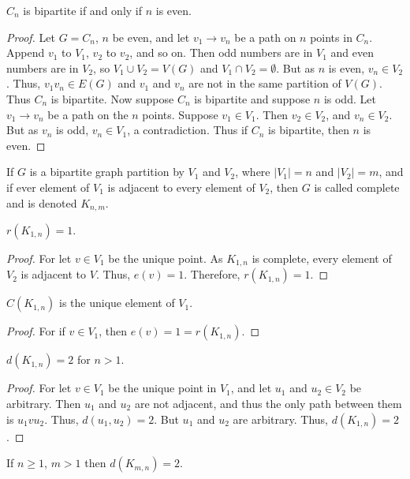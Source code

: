 \documentclass[crop=false,class=book,oneside]{standalone}
\begin{document}
\begin{theorem}
$C_n$ is bipartite if and only if $n$ is even. 
\end{theorem}
\begin{proof}
Let $G=C_n$, $n$ be even, and let $v_1\rightarrow v_n$ be a path on $n$ points in $C_n$. Append $v_1$ to $V_1$, $v_2$ to $v_2$, and so on. Then odd numbers are in $V_1$ and even numbers are in $V_2$, so $V_1\cup V_2 = V(G)$ and $V_1 \cap V_2 = \emptyset$. But as $n$ is even, $v_n \in V_2$. Thus, $v_1 v_n \in E(G)$ and $v_1$ and $v_n$ are not in the same partition of $V(G)$. Thus $C_n$ is bipartite. Now suppose $C_n$ is bipartite and suppose $n$ is odd. Let $v_1 \rightarrow v_n$ be a path on the $n$ points. Suppose $v_1 \in V_1$. Then $v_2 \in V_2$, and $v_n \in V_2$. But as $v_n$ is odd, $v_{n} \in V_1$, a contradiction. Thus if $C_n$ is bipartite, then $n$ is even.
\end{proof}
\begin{definition}
If $G$ is a bipartite graph partition by $V_1$ and $V_2$, where $|V_1| = n$ and $|V_2| = m$, and if ever element of $V_1$ is adjacent to every element of $V_2$, then $G$ is called complete and is denoted $K_{n,m}$.
\end{definition}
\begin{corollary}
$r(K_{1,n}) = 1$.
\end{corollary}
\begin{proof}
For let $v\in V_1$ be the unique point. As $K_{1,n}$ is complete, every element of $V_2$ is adjacent to $V$. Thus, $e(v) = 1$. Therefore, $r(K_{1,n}) =1$.
\end{proof}
\begin{corollary}
$C(K_{1,n})$ is the unique element of $V_1$.
\end{corollary}
\begin{proof}
For if $v\in V_1$, then $e(v) = 1 = r(K_{1,n})$.
\end{proof}
\begin{corollary}
$d(K_{1,n})=2$ for $n>1$.
\end{corollary}
\begin{proof}
For let $v\in V_1$ be the unique point in $V_1$, and let $u_1$ and $u_2 \in V_2$ be arbitrary. Then $u_1$ and $u_2$ are not adjacent, and thus the only path between them is $u_1 v u_2$. Thus, $d(u_1,u_2) = 2$. But $u_1$ and $u_2$ are arbitrary. Thus, $d(K_{1,n}) = 2$.
\end{proof}
\begin{corollary}
If $n\geq1$, $m> 1$ then $d(K_{m,n}) = 2$.
\end{corollary}
\end{document}
